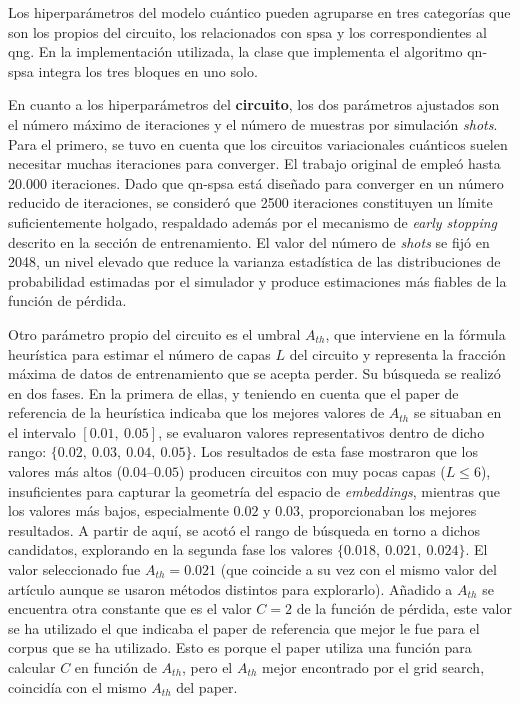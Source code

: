 Los hiperparámetros del modelo cuántico pueden agruparse en tres categorías que son los propios del circuito, los relacionados con \gls{spsa} y los correspondientes al \gls{qng}. En la implementación utilizada, la clase que implementa el algoritmo \gls{qn-spsa} integra los tres bloques en uno solo.

En cuanto a los hiperparámetros del \textbf{circuito}, los dos parámetros ajustados son el número máximo de iteraciones y el número de muestras por simulación \textit{shots}. Para el primero, se tuvo en cuenta que los circuitos variacionales cuánticos suelen necesitar muchas iteraciones para converger. El trabajo original de \cite{ohno_qword2vec_2025} empleó hasta 20.000 iteraciones. Dado que \gls{qn-spsa} está diseñado para converger en un número reducido de iteraciones, se consideró que 2500 iteraciones constituyen un límite suficientemente holgado, respaldado además por el mecanismo de \textit{early stopping} descrito en la sección de entrenamiento. El valor del número de \textit{shots} se fijó en 2048, un nivel elevado que reduce la varianza estadística de las distribuciones de probabilidad estimadas por el simulador y produce estimaciones más fiables de la función de pérdida.

Otro parámetro propio del circuito es el umbral $A_{th}$, que interviene en la fórmula heurística para estimar el número de capas $L$ del circuito y representa la fracción máxima de datos de entrenamiento que se acepta perder. Su búsqueda se realizó en dos fases. En la primera de ellas, y teniendo en cuenta que el paper de referencia de la heurística indicaba que los mejores valores de $A_{th}$ se situaban en el intervalo $[0.01,\ 0.05]$, se evaluaron valores representativos dentro de dicho rango: $\{0.02,\ 0.03,\ 0.04,\ 0.05\}$. Los resultados de esta fase mostraron que los valores más altos ($0.04$--$0.05$) producen circuitos con muy pocas capas ($L \leq 6$), insuficientes para capturar la geometría del espacio de \textit{embeddings}, mientras que los valores más bajos, especialmente $0.02$ y $0.03$, proporcionaban los mejores resultados. A partir de aquí, se acotó el rango de búsqueda en torno a dichos candidatos, explorando en la segunda fase los valores $\{0.018,\ 0.021,\ 0.024\}$. El valor seleccionado fue $A_{th} = 0.021$ (que coincide a su vez con el mismo valor del artículo \cite{ohno_qword2vec_2025} aunque se usaron métodos distintos para explorarlo). Añadido a $A_{th}$ se encuentra otra constante que es el valor $C = 2$ de la función de pérdida, este valor se ha utilizado el que indicaba el paper de referencia que mejor le fue para el corpus que se ha utilizado. Esto es porque el paper utiliza una función para calcular $C$ en función de $A_{th}$, pero el $A_{th}$ mejor encontrado por el grid search, coincidía con el mismo $A_{th}$ del paper.

